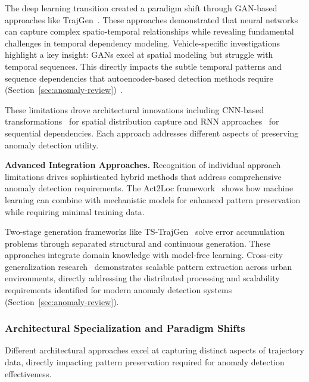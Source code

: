 \documentclass[runningheads]{llncs}
\begin{document}
The deep learning transition created a paradigm shift through GAN-based approaches like TrajGen~\cite{caoGeneratingMobilityTrajectories2021}. These approaches demonstrated that neural networks can capture complex spatio-temporal relationships while revealing fundamental challenges in temporal dependency modeling. Vehicle-specific investigations~\cite{bajarunasGenerativeAdversarialNetworks2022} highlight a key insight: GANs excel at spatial modeling but struggle with temporal sequences. This directly impacts the subtle temporal patterns and sequence dependencies that autoencoder-based detection methods require (Section~\ref{sec:anomaly-review})~\cite{huangLSTMAutoencodersAttention2021}.

These limitations drove architectural innovations including CNN-based transformations~\cite{merhiSyntheticTrajectoryGeneration2024} for spatial distribution capture and RNN approaches~\cite{duRecurrentMarkedTemporal2016} for sequential dependencies. Each approach addresses different aspects of preserving anomaly detection utility.

\textbf{Advanced Integration Approaches.} Recognition of individual approach limitations drives sophisticated hybrid methods that address comprehensive anomaly detection requirements. The Act2Loc framework~\cite{liuAct2LocSyntheticTrajectory2023} shows how machine learning can combine with mechanistic models for enhanced pattern preservation while requiring minimal training data.

Two-stage generation frameworks like TS-TrajGen~\cite{jiangContinuousTrajectoryGeneration2023} solve error accumulation problems through separated structural and continuous generation. These approaches integrate domain knowledge with model-free learning. Cross-city generalization research~\cite{wangGTGGeneralizableTrajectory2025} demonstrates scalable pattern extraction across urban environments, directly addressing the distributed processing and scalability requirements identified for modern anomaly detection systems (Section~\ref{sec:anomaly-review}).

\subsubsection{Architectural Specialization and Paradigm Shifts}

Different architectural approaches excel at capturing distinct aspects of trajectory data, directly impacting pattern preservation required for anomaly detection effectiveness.
\end{document}
